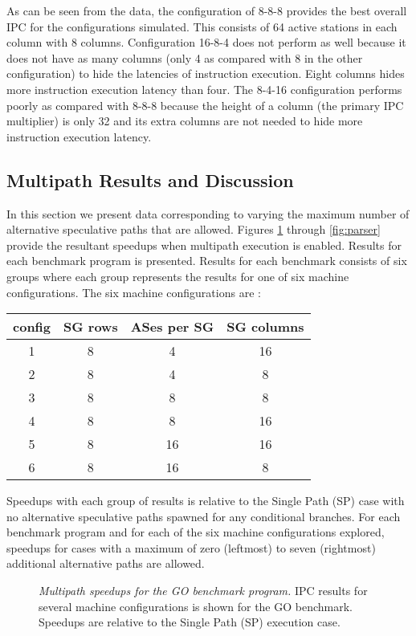 \documentclass[10pt,dvips]{article}
\begin{document}
As can be seen from the data, the configuration of 8-8-8 provides
the best overall IPC for the configurations simulated.  This consists
of 64 active stations in each column with 8 columns.
Configuration 16-8-4 does not perform as well because it does not
have as many columns (only 4 as compared with 8 in the other configuration)
to hide the latencies of instruction execution.  Eight columns 
hides more instruction execution latency than four.  The 8-4-16
configuration performs poorly as compared with 8-8-8 because the height
of a column (the primary IPC multiplier) is only 32 and its extra
columns are not needed to hide more instruction execution latency.
%
\subsection{Multipath Results and Discussion}
%
In this section we present data corresponding to varying the
maximum number of alternative speculative paths that are allowed.
Figures \ref{fig:go} through \ref{fig:parser} provide the resultant
speedups when multipath execution is enabled.  Results for
each benchmark program is presented.  Results for each benchmark 
consists of six groups where each group represents the results
for one of six machine configurations.
The six machine configurations are :

\begin{tabular}{|c|c|c|c|}
\hline 
config&
SG rows&
ASes per SG&
SG columns\\
\hline
\hline 
1&
8&
4&
16\\
\hline 
2&
8&
4&
8\\
\hline 
3&
8&
8&
8\\
\hline 
4&
8&
8&
16\\
\hline 
5&
8&
16&
16\\
\hline 
6&
8&
16&
8\\
\hline
\end{tabular}

Speedups with each group of results is relative to the
Single Path (SP) case with no alternative speculative paths spawned
for any conditional branches.  For each benchmark program and
for each of the six machine configurations explored, speedups
for cases with a maximum
of zero (leftmost) to seven (rightmost) additional alternative 
paths are allowed.

\begin{figure}[hb]
\centering
{}
\caption{{\em Multipath speedups for the GO benchmark program.} 
IPC results for several machine configurations is shown for the
GO benchmark.
Speedups are relative to the Single Path (SP) execution case.}
\label{fig:go}
\end{figure}
\end{document}
